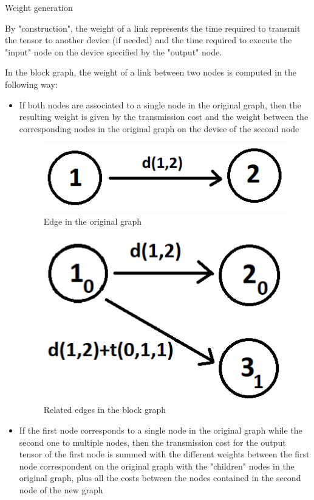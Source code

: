 \begin{frame}[allowframebreaks]{Weight generation}

    By "construction", the weight of a link represents the time required to transmit the tensor to another device (if needed) and the time required to execute the "input" node on the device specified by the "output" node.
    
    In the block graph, the weight of a link between two nodes is computed in the following way:
    \begin{itemize}
        \item If both nodes are associated to a single node in the original graph, then the resulting weight is given by the transmission cost and the weight between the corresponding nodes in the original graph on the device of the second node
        
    \begin{multicols}{2}
        \begin{figure}[h]
        \centering
    \includegraphics[width=0.5\linewidth]{Img/butcher/simple_edge.PNG}
    \caption{Edge in the original graph}
    \end{figure}
    
        \begin{figure}[h]
        \centering
    \includegraphics[width=0.4\linewidth]{Img/butcher/block_edge.PNG}
    \caption{Related edges in the block graph}
    \end{figure}
    \end{multicols}
        
        \framebreak
        
        \item If the first node corresponds to a single node in the original graph while the second one to multiple nodes, then the transmission cost for the output tensor of the first node is summed with the different weights between the first node correspondent on the original graph with the "children" nodes in the original graph, plus all the costs between the nodes contained in the second node of the new graph
        

\end{itemize}
\end{frame}
